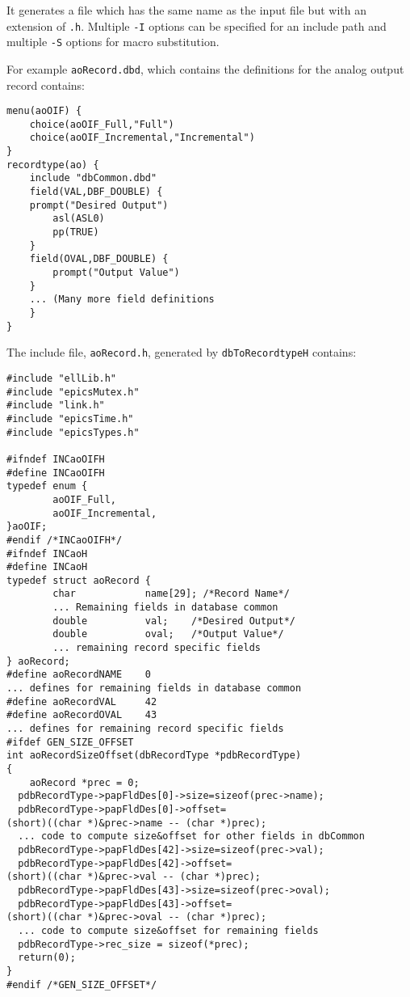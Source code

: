 It generates a file which has the same name as the input file but with an extension of \verb|.h|.
Multiple \verb|-I| options can be specified for an include path and multiple \verb|-S| options for macro substitution.

For example \verb|aoRecord.dbd|, which contains the definitions for the analog output record contains:

\begin{verbatim}
menu(aoOIF) {
    choice(aoOIF_Full,"Full")
    choice(aoOIF_Incremental,"Incremental")
}
recordtype(ao) {
    include "dbCommon.dbd"
    field(VAL,DBF_DOUBLE) {
    prompt("Desired Output")
        asl(ASL0)
        pp(TRUE)
    }
    field(OVAL,DBF_DOUBLE) {
        prompt("Output Value")
    }
    ... (Many more field definitions
    }
}
\end{verbatim}

The include file, \verb|aoRecord.h|, generated by \verb|dbToRecordtypeH| contains:

\begin{verbatim}
#include "ellLib.h"
#include "epicsMutex.h"
#include "link.h"
#include "epicsTime.h"
#include "epicsTypes.h"

#ifndef INCaoOIFH
#define INCaoOIFH
typedef enum {
        aoOIF_Full,
        aoOIF_Incremental,
}aoOIF;
#endif /*INCaoOIFH*/
#ifndef INCaoH
#define INCaoH
typedef struct aoRecord {
        char            name[29]; /*Record Name*/
        ... Remaining fields in database common
        double          val;    /*Desired Output*/
        double          oval;   /*Output Value*/
        ... remaining record specific fields
} aoRecord;
#define aoRecordNAME    0
... defines for remaining fields in database common
#define aoRecordVAL     42
#define aoRecordOVAL    43
... defines for remaining record specific fields
#ifdef GEN_SIZE_OFFSET
int aoRecordSizeOffset(dbRecordType *pdbRecordType)
{
    aoRecord *prec = 0;
  pdbRecordType->papFldDes[0]->size=sizeof(prec->name);
  pdbRecordType->papFldDes[0]->offset=
(short)((char *)&prec->name -- (char *)prec);
  ... code to compute size&offset for other fields in dbCommon
  pdbRecordType->papFldDes[42]->size=sizeof(prec->val);
  pdbRecordType->papFldDes[42]->offset=
(short)((char *)&prec->val -- (char *)prec);
  pdbRecordType->papFldDes[43]->size=sizeof(prec->oval);
  pdbRecordType->papFldDes[43]->offset=
(short)((char *)&prec->oval -- (char *)prec);
  ... code to compute size&offset for remaining fields
  pdbRecordType->rec_size = sizeof(*prec);
  return(0);
}
#endif /*GEN_SIZE_OFFSET*/

\end{verbatim}

